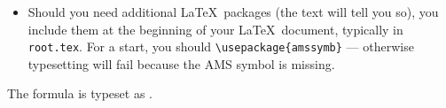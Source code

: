 \begin{isabellebody}
\begin{isamarkuptext}
\begin{itemize}
\item Should you need additional \LaTeX\ packages (the text will tell
you so), you include them at the beginning of your \LaTeX\ document,
typically in \texttt{root.tex}. For a start, you should
\verb!\usepackage{amssymb}! --- otherwise typesetting
 will fail because the AMS symbol
\isa{{\isasymnexists}} is missing.
\end{itemize}%
\end{isamarkuptext}%
\isamarkuptrue%
%
\isamarkuptrue%
%
\isamarkuptrue%
%
\begin{isamarkuptext}%
The formula  is typeset as .


\end{isamarkuptext}
\end{isabellebody}
